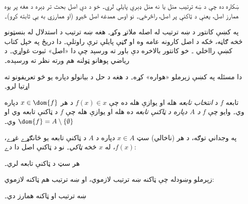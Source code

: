 \documentclass[../../../include/open-logic-section]{subfiles}
\begin{document}

ښکاره ده چې د ښه ترتيب منل يا نه منل ډېرې پايلې لري۔
خو د دې اصل بحث تر ډېره د هغه پر يوه همارز اصل، يعنې
د ټاکنې پر اصل، راڅرخي۔ نو اوس همدغه اصل څېړو
(او همارزي به يې ثابته کړو)۔

په \citeyear{Cantor1883} کښې کانتور د ښه ترتيب
له اصله ملاتړ وکړ۔ هغه ښه ترتيب د استدلال له بنسټونو څخه ګاڼه، ځکه د اصل کارونه عامه وه او ګڼې پايلې ترې راوتلې۔ دا دريځ \citeauthor{Potter2004} په خپل کتاب کښې رااخلي
\citeyear[p.~243]{Potter2004}۔
خو کانتور بالاخره دې باور ته ورسېد چې دا «اصل»
ثبوت غواړي۔ د رياضي پوهانو ټولنه هم ورته نظر ته ورسېده۔

دا مسئله په \citeyear{Zermelo1904} کښې زېرملو
«هواره» کړه۔ د هغه د حل د بيانولو دپاره يو څو
تعريفونو ته اړتيا لرو۔

\begin{defn}
تابعه $f$ د \emph{انتخاب تابعه} هله او يوازې هله ده
چې $f(x) \in x$ د هر $x \in \dom{f}$ دپاره وي۔
وايو چې $f$ \emph{د $A$ دپاره د ټاکنې تابعه} ده
هله او يوازې هله چې $f$ د ټاکنې تابعه وي او
$\dom{f} = A \setminus \{\emptyset\}$ وي۔
\end{defn}

په وجداني توګه، د هر (ناخالي) سټ
$x \in A$ دپاره د $A$ د ټاکنې تابعه
يو ځانګړے غړے، $f(x)$، له $x$ څخه
\emph{ټاکي}۔ نو د ټاکنې اصل دا دے:

\begin{axiom}[ټاکنه]
هر سټ د ټاکنې تابعه لري۔
\end{axiom}

زېرملو وښودله چې ټاکنه ښه ترتيب لازموي، او
ښه ترتيب هم ټاکنه لازموي:

\begin{thm}[په $\ZF$ کښې]
ښه ترتيب او ټاکنه همارز دي۔
\end{thm}
\end{document}
